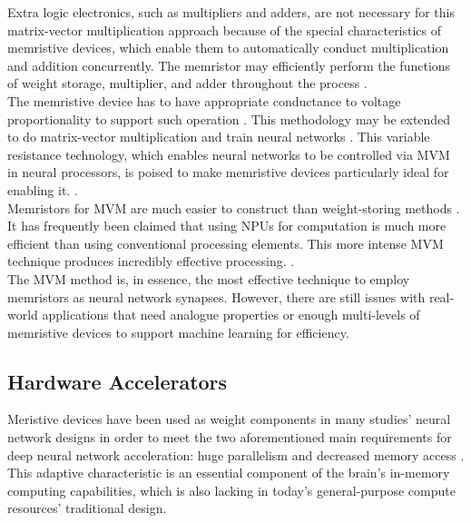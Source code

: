 \noindent Extra logic electronics, such as multipliers and adders, are not necessary for this matrix-vector multiplication approach because of the special characteristics of memristive devices, which enable them to automatically conduct multiplication and addition concurrently. The memristor may efficiently perform the functions of weight storage, multiplier, and adder throughout the process \cite{perez2016impact}. \\

\noindent The memristive device has to have appropriate conductance to voltage proportionality to support such operation \cite{merced2016repeatable}. This methodology may be extended to do matrix-vector multiplication and train neural networks \cite{sheridan2017sparse}. This variable resistance technology, which enables neural networks to be controlled via MVM in neural processors, is poised to make memristive devices particularly ideal for enabling it. \cite{xia2017mnsim}. \\

\noindent Memristors for MVM are much easier to construct than weight-storing methods \cite{hasan2016high}. It has frequently been claimed that using NPUs for computation is much more efficient than using conventional processing elements. This more intense MVM technique produces incredibly effective processing. \cite{courbariaux2016binarized}. \\

\noindent The MVM method is, in essence, the most effective technique to employ memristors as neural network synapses. However, there are still issues with real-world applications that need analogue properties or enough multi-levels of memristive devices to support machine learning for efficiency.

\subsection[Hardware Accelerators]{Hardware Accelerators}

Meristive devices have been used as weight components in many studies' neural network designs \cite{sidler2016large} in order to meet the two aforementioned main requirements for deep neural network acceleration: huge parallelism and decreased memory access \cite{azghadi2016hybrid}. This adaptive characteristic is an essential component of the brain's in-memory computing capabilities, which is also lacking in today's general-purpose compute resources' traditional design. \\

